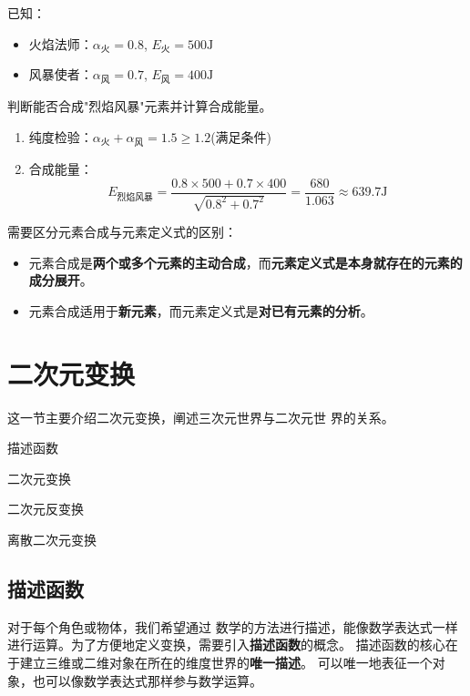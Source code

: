 \documentclass[lang=cn,newtx,10pt,scheme=chinese]{elegantbook}
\begin{document}
\begin{example}[元素合成计算]
    已知：
    \begin{itemize}
        \item 火焰法师：$\alpha_{\text{火}}=0.8$, $E_{\text{火}}=500\text{J}$
        \item 风暴使者：$\alpha_{\text{风}}=0.7$, $E_{\text{风}}=400\text{J}$
    \end{itemize}
    判断能否合成"烈焰风暴"元素并计算合成能量。

    \solution
    \begin{enumerate}
        \item 纯度检验：$\alpha_{\text{火}} + \alpha_{\text{风}} = 1.5 \geq 1.2$(满足条件)
        \item 合成能量：
              $$
                  E_{\text{烈焰风暴}} = \frac{0.8 \times 500 + 0.7 \times 400}{\sqrt{0.8^2 + 0.7^2}} = \frac{680}{1.063} \approx 639.7\text{J}
              $$
    \end{enumerate}
\end{example}

需要区分元素合成与元素定义式的区别：
\begin{itemize}
    \item 元素合成是\textbf{两个或多个元素的主动合成}，而\textbf{元素定义式是本身就存在的元素的成分展开}。
    \item 元素合成适用于\textbf{新元素}，而元素定义式是\textbf{对已有元素的分析}。
\end{itemize}

\section{二次元变换}
这一节主要介绍二次元变换，阐述三次元世界与二次元世
界的关系。
\begin{introduction}
    \item 描述函数
    \item 二次元变换
    \item 二次元反变换
    \item 离散二次元变换
\end{introduction}

\subsection{描述函数}
对于每个角色或物体，我们希望通过
数学的方法进行描述，能像数学表达式一样进行运算。为了方便地定义变换，需要引入\textbf{描述函数}的概念。
描述函数的核心在于建立三维或二维对象在所在的维度世界的\textbf{唯一描述}。
可以唯一地表征一个对象，也可以像数学表达式那样参与数学运算。
\end{document}
